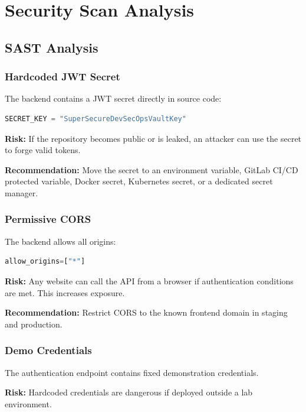 \documentclass[12pt,a4paper]{report}
\begin{document}
\chapter{Security Scan Analysis}

\section{SAST Analysis}

\subsection{Hardcoded JWT Secret}

The backend contains a JWT secret directly in source code:

\begin{lstlisting}[language=Python,caption={Example of hardcoded secret pattern}]
SECRET_KEY = "SuperSecureDevSecOpsVaultKey"
\end{lstlisting}

\textbf{Risk:} If the repository becomes public or is leaked, an attacker can use the secret to forge valid tokens.

\textbf{Recommendation:} Move the secret to an environment variable, GitLab CI/CD protected variable, Docker secret, Kubernetes secret, or a dedicated secret manager.

\subsection{Permissive CORS}

The backend allows all origins:

\begin{lstlisting}[language=Python,caption={Permissive CORS pattern}]
allow_origins=["*"]
\end{lstlisting}

\textbf{Risk:} Any website can call the API from a browser if authentication conditions are met. This increases exposure.

\textbf{Recommendation:} Restrict CORS to the known frontend domain in staging and production.

\subsection{Demo Credentials}

The authentication endpoint contains fixed demonstration credentials.

\textbf{Risk:} Hardcoded credentials are dangerous if deployed outside a lab environment.
\end{document}
